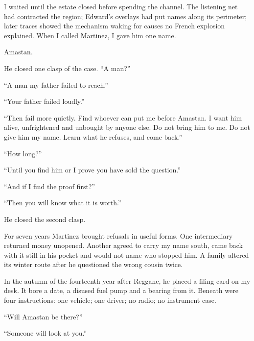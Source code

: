 I waited until the estate closed before spending the channel. The listening net had contracted the region; Edward's overlays had put names along its perimeter; later traces showed the mechanism waking for causes no French explosion explained. When I called Martinez, I gave him one name.\par

Amastan.\par

He closed one clasp of the case. “A man?”\par

“A man my father failed to reach.”\par

“Your father failed loudly.”\par

“Then fail more quietly. Find whoever can put me before Amastan. I want him alive, unfrightened and unbought by anyone else. Do not bring him to me. Do not give him my name. Learn what he refuses, and come back.”\par

“How long?”\par

“Until you find him or I prove you have sold the question.”\par

“And if I find the proof first?”\par

“Then you will know what it is worth.”\par

He closed the second clasp.\par

For seven years Martinez brought refusals in useful forms. One intermediary returned money unopened. Another agreed to carry my name south, came back with it still in his pocket and would not name who stopped him. A family altered its winter route after he questioned the wrong cousin twice.\par

In the autumn of the fourteenth year after Reggane, he placed a filing card on my desk. It bore a date, a disused fuel pump and a bearing from it. Beneath were four instructions: one vehicle; one driver; no radio; no instrument case.\par

“Will Amastan be there?”\par

“Someone will look at you.”\par

